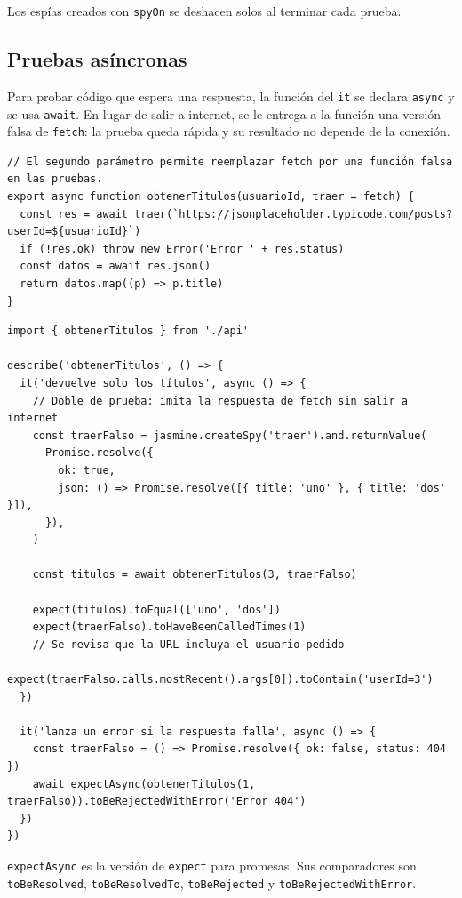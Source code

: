 \documentclass[11pt,a4paper]{article}
\newcommand{\cmd}[1]{\texttt{\color{reactdark}#1}}
\begin{document}
Los espías creados con \cmd{spyOn} se deshacen solos al terminar cada prueba.

\subsection{Pruebas asíncronas}

Para probar código que espera una respuesta, la función del \cmd{it} se declara \cmd{async} y se usa \cmd{await}. En lugar de salir a internet, se le entrega a la función una versión falsa de \cmd{fetch}: la prueba queda rápida y su resultado no depende de la conexión.

\begin{lstlisting}[language=JSX,title={\small\ttfamily src/logica/api.js}]
// El segundo parámetro permite reemplazar fetch por una función falsa en las pruebas.
export async function obtenerTitulos(usuarioId, traer = fetch) {
  const res = await traer(`https://jsonplaceholder.typicode.com/posts?userId=${usuarioId}`)
  if (!res.ok) throw new Error('Error ' + res.status)
  const datos = await res.json()
  return datos.map((p) => p.title)
}
\end{lstlisting}
\begin{lstlisting}[language=JSX,title={\small\ttfamily src/logica/api.spec.js}]
import { obtenerTitulos } from './api'

describe('obtenerTitulos', () => {
  it('devuelve solo los títulos', async () => {
    // Doble de prueba: imita la respuesta de fetch sin salir a internet
    const traerFalso = jasmine.createSpy('traer').and.returnValue(
      Promise.resolve({
        ok: true,
        json: () => Promise.resolve([{ title: 'uno' }, { title: 'dos' }]),
      }),
    )

    const titulos = await obtenerTitulos(3, traerFalso)

    expect(titulos).toEqual(['uno', 'dos'])
    expect(traerFalso).toHaveBeenCalledTimes(1)
    // Se revisa que la URL incluya el usuario pedido
    expect(traerFalso.calls.mostRecent().args[0]).toContain('userId=3')
  })

  it('lanza un error si la respuesta falla', async () => {
    const traerFalso = () => Promise.resolve({ ok: false, status: 404 })
    await expectAsync(obtenerTitulos(1, traerFalso)).toBeRejectedWithError('Error 404')
  })
})
\end{lstlisting}

\cmd{expectAsync} es la versión de \cmd{expect} para promesas. Sus comparadores son \cmd{toBeResolved}, \cmd{toBeResolvedTo}, \cmd{toBeRejected} y \cmd{toBeRejectedWithError}.
\end{document}
